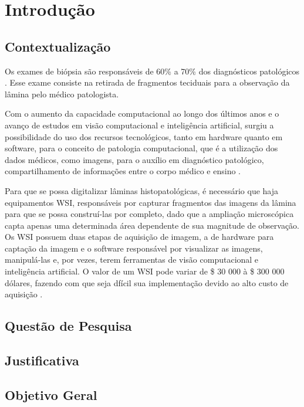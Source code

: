 \chapter{Introdução}

\section{Contextualização}
Os exames de biópsia são responsáveis de 60\% a 70\% dos diagnósticos patológicos \cite{auguste2015mobile}. Esse exame consiste na retirada de fragmentos teciduais para a observação da lâmina pelo médico patologista.

Com o aumento da capacidade computacional ao longo dos últimos anos e o avanço de estudos em visão computacional e inteligência artificial, surgiu a possibilidade do uso dos recursos tecnológicos, tanto em hardware quanto em software, para o conceito de patologia computacional, que é a utilização dos dados médicos, como imagens, para o auxílio em diagnóstico patológico, compartilhamento de informações entre o corpo médico e ensino \cite{louis2014computational}.

Para que se possa digitalizar lâminas histopatológicas, é necessário que haja equipamentos WSI, responsáveis por capturar fragmentos das imagens da lâmina para que se possa construí-las por completo, dado que a ampliação microscópica capta apenas uma determinada área dependente de sua magnitude de observação. Os WSI possuem duas etapas de aquisição de imagem, a de hardware para captação da imagem e o software responsável por visualizar as imagens, manipulá-las e, por vezes, terem ferramentas de visão computacional e inteligência artificial. O valor de um WSI pode variar de  \$ 30 000 à \$ 300 000 dólares, fazendo com que seja dfícil sua implementação devido ao alto custo de aquisição \cite{auguste2015mobile}.


\section{Questão de Pesquisa}

\section{Justificativa}

\section{Objetivo Geral}

